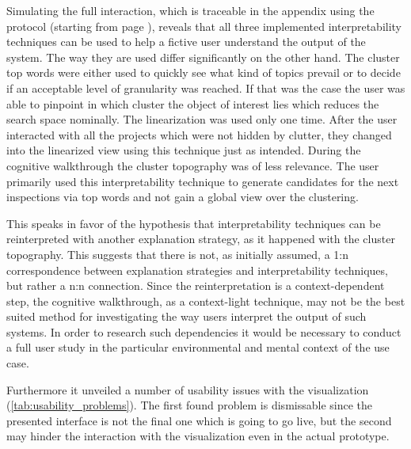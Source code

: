 Simulating the full interaction, which is traceable in the appendix using the protocol (starting from page \pageref{ch:Appendix}),   reveals that all three implemented interpretability techniques can be used to help a fictive user understand the output of the system. The way they are used differ significantly on the other hand. 
The cluster top words were either used to quickly see what kind of topics prevail or to decide if an acceptable level of granularity was reached. If that was the case the user was able to pinpoint in which cluster the object of interest lies which reduces the search space nominally. 
The linearization was used only one time. After the user interacted with all the projects which were not hidden by clutter, they changed into the linearized view using this technique just as intended.
During the cognitive walkthrough the cluster topography was of less relevance. The user primarily used this interpretability technique to generate candidates for the next inspections via top words and not gain a global view over the clustering.

This speaks in favor of the hypothesis that interpretability techniques can be reinterpreted with another explanation strategy, as it happened with the cluster topography. This suggests that there is not, as initially assumed, a 1:n correspondence between explanation strategies and interpretability techniques, but rather a n:n connection. Since the reinterpretation is a context-dependent step, the cognitive walkthrough, as a context-light technique, may not be the best suited method for investigating the way users interpret the output of such systems. In order to research such dependencies it would be necessary to conduct a full user study in the particular environmental and mental context of the use case.

Furthermore it unveiled a number of usability issues with the visualization (\autoref{tab:usability_problems}). The first found problem is dismissable since the presented interface is not the final one which is going to go live, but the second may hinder the interaction with the visualization even in the actual prototype.

